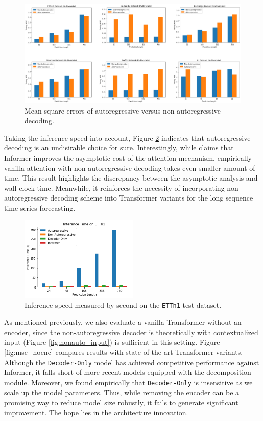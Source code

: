 \begin{figure}
    \centering
    \includegraphics[width=\textwidth]{img/mse_nonauto.png}
    \caption{Mean square errors of autoregressive versus non-autoregressive decoding.}
    \label{fig:mse_nonauto}
\end{figure}

Taking the inference speed into account, Figure \ref{fig:nonauto_time} indicates that autoregressive decoding is an undisirable choice for sure. 
Interestingly, while \citet{https://doi.org/10.48550/arxiv.2012.07436} claims that Informer improves the asymptotic cost of the attention mechanism, empirically vanilla attention with non-autoregressive decoding takes even smaller amount of time. 
This result highlights the discrepancy between the asymptotic analysis and wall-clock time. 
Meanwhile, it reinforces the necessity of incorporating non-autoregressive decoding scheme into Transformer variants for the long sequence time series forecasting. 

\begin{figure}
    \centering
    \includegraphics[width=0.5\textwidth]{img/nonauto_time.png}
    \caption{Inference speed measured by second on the \texttt{ETTh1} test dataset.}
    \label{fig:nonauto_time}
\end{figure}

As mentioned previously, we also evaluate a vanilla Transformer without an encoder, since the non-autoregressive decoder is theoretically with contextualized input (Figure \ref{fig:nonauto_input}) is sufficient in this setting. 
Figure \ref{fig:mse_noenc} compares results with state-of-the-art Transformer variants. 
Although the \texttt{Decoder-Only} model has achieved competitive performance against Informer, it falls short of more recent models equipped with the decomposition module. 
Moreover, we found empirically that \texttt{Decoder-Only} is insensitive as we scale up the model parameters. 
Thus, while removing the encoder can be a promising way to reduce model size robustly, it fails to generate significant improvement. 
The hope lies in the architecture innovation. 

